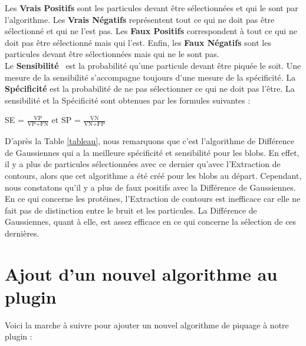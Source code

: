 Les \textbf{Vrais Positifs} sont les particules devant être sélectionnées et qui le sont par l'algorithme. Les \textbf{Vrais Négatifs} représentent tout ce qui ne doit pas être sélectionné et qui ne l'est pas. Les \textbf{Faux Positifs} correspondent à tout ce qui ne doit pas être sélectionné mais qui l'est. Enfin, les \textbf{Faux Négatifs} sont les particules devant être sélectionnées mais qui ne le sont pas. \\ 
Le \textbf{Sensibilité}~\cite{stats:url} est la probabilité qu'une particule devant être piquée le soit. Une mesure de la sensibilité s'accompagne toujours d'une mesure de la spécificité. La \textbf{Spécificité} est la probabilité de ne pas sélectionner ce qui ne doit pas l'être. La sensibilité et la Spécificité sont obtenues par les formules suivantes : \\

\begin{center}
SE = $\frac{\text{VP}}{\text{VP+FN}}$ et SP = $\frac{\text{VN}}{\text{VN+FP}}$ \\
\end{center}

D'après la Table \ref{tableau}, nous remarquons que c'est l'algorithme de Différence de Gaussiennes qui a la meilleure spécificité et sensibilité pour les blobs. En effet, il y a plus de particules sélectionnées avec ce dernier qu'avec l'Extraction de contours, alors que cet algorithme a été créé pour les blobs au départ. Cependant, nous constatons qu'il y a plus de faux positifs avec la Différence de Gaussiennes. \\
En ce qui concerne les protéines, l'Extraction de contours est inefficace car elle ne fait pas de distinction entre le bruit et les particules. La Différence de Gaussiennes, quant à elle, est assez efficace en ce qui concerne la sélection de ces dernières. 

\section{Ajout d'un nouvel algorithme au plugin}

Voici la marche à suivre pour ajouter un nouvel algorithme de piquage à notre plugin :

